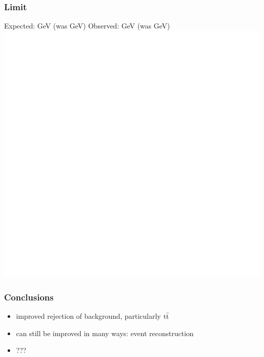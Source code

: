 \documentclass[ukenglish]{beamer}
\begin{document}
\begin{frame}
    \frametitle{Limit}
    Expected: \unit[658]{GeV} (was \unit[645]{GeV})
    Observed: \unit[633]{GeV} (was \unit[645]{GeV})
    \includegraphics[height=.5\textheight]{oLimit_limit_macro_4j_razor_tight_C.eps}
\end{frame}

\begin{frame}
    \frametitle{Conclusions}
    \begin{itemize}
        \item improved rejection of background, particularly $\mathrm{t}\bar{\mathrm{t}}$
        \item can still be improved in many ways: event reconstruction
        \item ???
    \end{itemize}
\end{frame}
\end{document}
